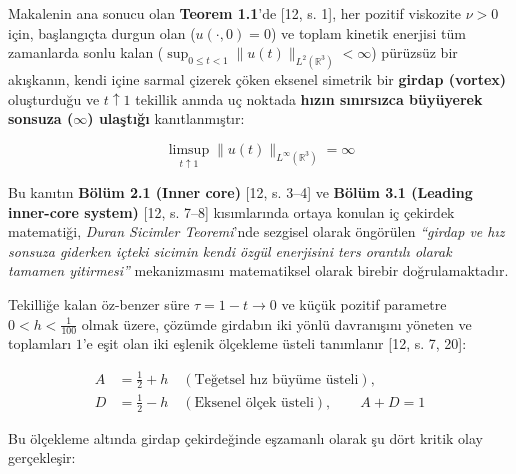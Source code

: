 \documentclass[12pt,a4paper]{article}
\begin{document}
Makalenin ana sonucu olan \textbf{Teorem 1.1}'de [12, s. 1], her pozitif viskozite $\nu > 0$ için, başlangıçta durgun olan ($u(\cdot, 0) = 0$) ve toplam kinetik enerjisi tüm zamanlarda sonlu kalan ($\sup_{0 \le t < 1} \|u(t)\|_{L^2(\mathbb{R}^3)} < \infty$) pürüzsüz bir akışkanın, kendi içine sarmal çizerek çöken eksenel simetrik bir \textbf{girdap (vortex)} oluşturduğu ve $t \uparrow 1$ tekillik anında uç noktada \textbf{hızın sınırsızca büyüyerek sonsuza ($\infty$) ulaştığı} kanıtlanmıştır:

\begin{equation}
\limsup_{t \uparrow 1} \|u(t)\|_{L^\infty(\mathbb{R}^3)} = \infty
\end{equation}

Bu kanıtın \textbf{Bölüm 2.1 (Inner core)} [12, s. 3--4] ve \textbf{Bölüm 3.1 (Leading inner-core system)} [12, s. 7--8] kısımlarında ortaya konulan iç çekirdek matematiği, \textit{Duran Sicimler Teoremi}'nde sezgisel olarak öngörülen \textit{``girdap ve hız sonsuza giderken içteki sicimin kendi özgül enerjisini ters orantılı olarak tamamen yitirmesi''} mekanizmasını matematiksel olarak birebir doğrulamaktadır.

Tekilliğe kalan öz-benzer süre $\tau = 1 - t \to 0$ ve küçük pozitif parametre $0 < h < \frac{1}{100}$ olmak üzere, çözümde girdabın iki yönlü davranışını yöneten ve toplamları $1$'e eşit olan iki eşlenik ölçekleme üsteli tanımlanır [12, s. 7, 20]:

\begin{equation}
\begin{split}
A &= \frac{1}{2} + h \quad (\text{Teğetsel hız büyüme üsteli}), \\
D &= \frac{1}{2} - h \quad (\text{Eksenel ölçek üsteli}), \qquad A + D = 1
\end{split}
\end{equation}

Bu ölçekleme altında girdap çekirdeğinde eşzamanlı olarak şu dört kritik olay gerçekleşir:
\end{document}
